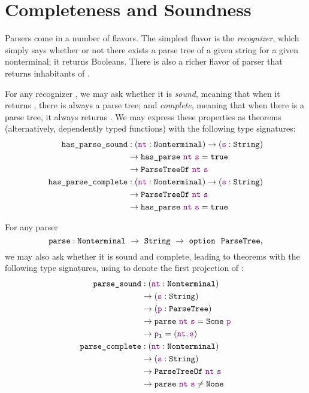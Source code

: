\chapter{Completeness and Soundness}
    Parsers come in a number of flavors.  The simplest flavor is the \emph{recognizer}, which simply says whether or not there exists a parse tree of a given string for a given nonterminal; it returns Booleans.  There is also a richer flavor of parser that returns inhabitants of .

    For any recognizer , we may ask whether it is \emph{sound}, meaning that when it returns \true, there is always a parse tree; and \emph{complete}, meaning that when there is a parse tree, it always returns \true.  We may express these properties as theorems (alternatively, dependently typed functions) with the following type signatures:
    \begin{align*}
      \fname{has\_parse\_sound} & \oftypesep
      (\oftype{\farg{nt}}{\Nonterminal})
      \typeto (\oftype{\farg{s}}{\String}) \\
      & \typeto \fname{has\_parse}~\farg{nt}~\farg{s} = \true \\
      & \typeto \indname{ParseTreeOf}~\farg{nt}~\farg{s} \\
      \fname{has\_parse\_complete} & \oftypesep
      (\oftype{\farg{nt}}{\Nonterminal})
      \typeto (\oftype{\farg{s}}{\String}) \\
      & \typeto \indname{ParseTreeOf}~\farg{nt}~\farg{s} \\
      & \typeto \fname{has\_parse}~\farg{nt}~\farg{s} = \true
    \end{align*}

    For any parser
    $$\oftype{\fname{parse}}{\Nonterminal~\typeto~\String~\typeto~\typeoption{\indname{ParseTree}}},$$
    we may also ask whether it is sound and complete, leading to theorems with the following type signatures, using  to denote the first projection of :
    \begin{align*}
      \fname{parse\_sound} & \oftypesep
      (\oftype{\farg{nt}}{\Nonterminal}) \\
      & \typeto (\oftype{\farg{s}}{\String}) \\
      & \typeto (\oftype{\farg{p}}{\indname{ParseTree}}) \\
      & \typeto \fname{parse}~\farg{nt}~\farg{s} = \Some{\farg{p}} \\
      & \typeto \proj1{\farg{p}} = (\farg{nt}, \farg{s}) \\
      \fname{parse\_complete} & \oftypesep
      (\oftype{\farg{nt}}{\Nonterminal}) \\
      & \typeto (\oftype{\farg{s}}{\String}) \\
      & \typeto \indname{ParseTreeOf}~\farg{nt}~\farg{s} \\
      & \typeto \fname{parse}~\farg{nt}~\farg{s} \neq \None \\
    \end{align*}


